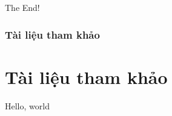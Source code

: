 \documentclass[12pt]{beamer}
\begin{document}
    \begin{frame}
        \Large \centering
        The End!
    \end{frame}

    \begin{frame}[t]
        \frametitle{Tài liệu tham khảo}
        \section{Tài liệu tham khảo}
        
        \begin{thebibliography}{10}
             Hello, world
        \end{thebibliography}
    \end{frame}
\end{document}
